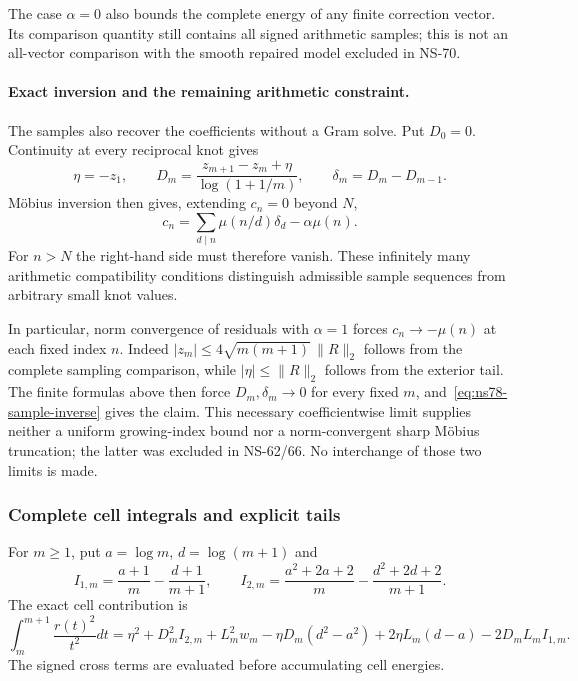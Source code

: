 \documentclass[11pt]{article}
\theoremstyle{remark}
\begin{document}
The case $\alpha=0$ also bounds the complete energy of any finite
correction vector. Its comparison quantity still contains all signed
arithmetic samples; this is not an all-vector comparison with the
smooth repaired model excluded in NS-70.

\paragraph{Exact inversion and the remaining arithmetic constraint.}
The samples also recover the coefficients without a Gram solve. Put
$D_0=0$. Continuity at every reciprocal knot gives
\[
 \eta=-z_1,\qquad
 D_m=\frac{z_{m+1}-z_m+\eta}{\log(1+1/m)},\qquad
 \delta_m=D_m-D_{m-1}.
\]
M\"obius inversion then gives, extending $c_n=0$ beyond $N$,
\begin{equation}
 c_n=\sum_{d\mid n}\mu(n/d)\delta_d-\alpha\mu(n).
 \label{eq:ns78-sample-inverse}
\end{equation}
For $n>N$ the right-hand side must therefore vanish. These infinitely
many arithmetic compatibility conditions distinguish admissible sample
sequences from arbitrary small knot values.

In particular, norm convergence of residuals with $\alpha=1$ forces
$c_n\to-\mu(n)$ at each fixed index $n$. Indeed
$|z_m|\leq4\sqrt{m(m+1)}\,\|R\|_2$ follows from the complete
sampling comparison, while $|\eta|\leq\|R\|_2$ follows from the
exterior tail. The finite formulas above then force $D_m,\delta_m\to0$
for every fixed $m$, and~\eqref{eq:ns78-sample-inverse} gives the claim.
This necessary coefficientwise limit supplies neither a uniform growing-index
bound nor a norm-convergent sharp M\"obius truncation; the latter was
excluded in NS-62/66. No interchange of those two limits is made.

\subsubsection*{Complete cell integrals and explicit tails}
\label{subsec:ns78-tails}
For $m\geq1$, put $a=\log m$, $d=\log(m+1)$ and
\[
 I_{1,m}=\frac{a+1}{m}-\frac{d+1}{m+1},\qquad
 I_{2,m}=\frac{a^2+2a+2}{m}-\frac{d^2+2d+2}{m+1}.
\]
The exact cell contribution is
\begin{equation}
 \int_m^{m+1}\frac{r(t)^2}{t^2}dt
 =\eta^2+D_m^2I_{2,m}+L_m^2w_m
 -\eta D_m(d^2-a^2)+2\eta L_m(d-a)-2D_mL_mI_{1,m}.
 \label{eq:ns78-exact-cell}
\end{equation}
The signed cross terms are evaluated before accumulating cell energies.
\end{document}
